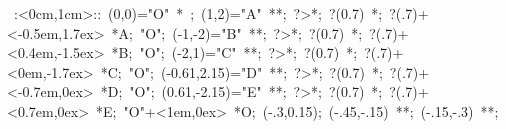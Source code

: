 
%

\hbox{
\xy    <1cm,0cm>:<0cm,1cm>::
       (0,0)="O" *{\bullet}  ; (1,2)="A" **\dir{-}; ?>*\dir{>};
          ?(0.7) *{\bullet};
          ?(.7)+<-0.5em,1.7ex> *{A};
       "O"; (-1,-2)="B" **\dir{-}; ?>*\dir{>}; ?(0.7) *{\bullet};
          ?(.7)+<0.4em,-1.5ex> *{B};
       "O"; (-2,1)="C" **\dir{-}; ?>*\dir{>}; ?(0.7) *{\bullet};
          ?(.7)+<0em,-1.7ex> *{C};
       "O"; (-0.61,2.15)="D" **\dir{-}; ?>*\dir{>}; ?(0.7) *{\bullet};
          ?(.7)+<-0.7em,0ex> *{D};
       "O"; (0.61,-2.15)="E" **\dir{-}; ?>*\dir{>}; ?(0.7) *{\bullet};
          ?(.7)+<0.7em,0ex> *{E};
       "O"+<1em,0ex> *{O};
       (-.3,0.15); (-.45,-.15) **\dir{-}; (-.15,-.3) **\dir{-};
       \endxy}


